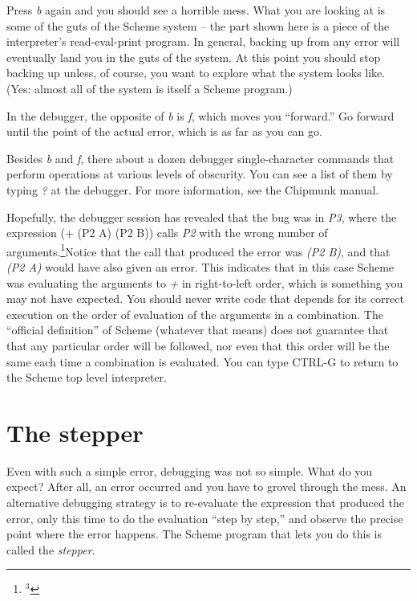 Press {\it b} again and you should see a horrible mess.  What you
are looking at is some of the guts of the Scheme system -- the part
shown here is a
piece of the interpreter's read-eval-print program.  In general,
backing up from any error will eventually land you in the guts of
the system.  At this point you should stop backing up unless, of
course, you want to explore what the system looks like.  (Yes:
almost all of the system is itself a Scheme program.)

In the debugger, the opposite of {\it b} is {\it f}, which moves you
``forward.'' Go forward until the point of the actual error,
which is as far as you can go.

Besides {\it b} and {\it f}, there about a dozen debugger
single-character commands that perform operations at various
levels of obscurity.  You can see a list of them by typing {\it ?}
at the debugger.  For more information, see the Chipmunk manual.

Hopefully, the debugger session has revealed that the bug was in
{\it P3}, where the expression \beginlisp(+ (P2 A) (P2 B))\endlisp
calls {\it P2} 
with the wrong number of arguments.\footnote{$^3$}{Notice that the call
that produced the error was {\it (P2 B)}, and that {\it (P2 A)} would
have also given an error.  This indicates that in this case
Scheme was evaluating the arguments to {\it +} in right-to-left
order, which is something you may not have expected. You should
never write code that depends for its correct execution on the
order of evaluation of the arguments in a combination.  The
``official definition'' of Scheme (whatever that means) does not
guarantee that that any particular order will be followed, nor
even that this order will be the same each time a combination is
evaluated.} You can type CTRL-G to return to the Scheme top level
interpreter.

\section{The stepper}

Even with such a simple error, debugging was not so simple.
What do you expect?  After all, an error occurred and you
have to grovel through the mess.  An alternative debugging
strategy is to re-evaluate the expression that produced the error, only
this time to do the evaluation ``step by step,'' and observe the
precise point where the error happens.  The Scheme program that
lets you do this is called the {\it stepper}.

